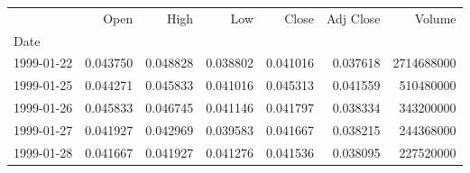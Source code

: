 \begin{tabular}{lrrrrrr}
\toprule
{} &      Open &      High &       Low &     Close &  Adj Close &      Volume \\
Date       &           &           &           &           &            &             \\
\midrule
1999-01-22 &  0.043750 &  0.048828 &  0.038802 &  0.041016 &   0.037618 &  2714688000 \\
1999-01-25 &  0.044271 &  0.045833 &  0.041016 &  0.045313 &   0.041559 &   510480000 \\
1999-01-26 &  0.045833 &  0.046745 &  0.041146 &  0.041797 &   0.038334 &   343200000 \\
1999-01-27 &  0.041927 &  0.042969 &  0.039583 &  0.041667 &   0.038215 &   244368000 \\
1999-01-28 &  0.041667 &  0.041927 &  0.041276 &  0.041536 &   0.038095 &   227520000 \\
\bottomrule
\end{tabular}
